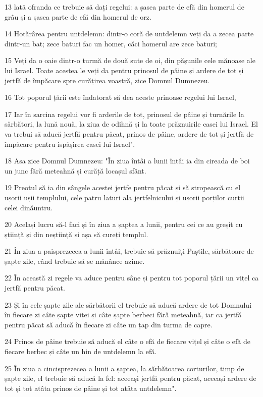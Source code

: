\par 13 lată ofranda ce trebuie să dați regelui: a șasea parte de efă din homerul de grâu și a șasea parte de efă din homerul de orz.
\par 14 Hotărârea pentru untdelemn: dintr-o coră de untdelemn veți da a zecea parte dintr-un bat; zece baturi fac un homer, căci homerul are zece baturi;
\par 15 Veți da o oaie dintr-o turmă de două sute de oi, din pășunile cele mănoase ale lui Israel. Toate acestea le veți da pentru prinosul de pâine și ardere de tot și jertfă de împăcare spre curățirea voastră, zice Domnul Dumnezeu.
\par 16 Tot poporul țării este îndatorat să dea aceste prinoase regelui lui Israel,
\par 17 Iar în sarcina regelui vor fi arderile de tot, prinosul de pâine și turnările la sărbători, la lună nouă, la ziua de odihnă și la toate prăznuirile casei lui Israel. El va trebui să aducă jertfă pentru păcat, prinos de pâine, ardere de tot și jertfă de împăcare pentru ispășirea casei lui Israel".
\par 18 Asa zice Domnul Dumnezeu: "În ziua întâi a lunii întâi ia din cireada de boi un junc fără meteahnă și curăță locașul sfânt.
\par 19 Preotul să ia din sângele acestei jertfe pentru păcat și să stropească cu el ușorii ușii templului, cele patru laturi ala jertfelnicului și ușorii porților curții celei dinăuntru.
\par 20 Același lucru să-l faci și în ziua a șaptea a lunii, pentru cei ce au greșit cu știință și din neștiință și așa să cureți templul.
\par 21 În ziua a paisprezecea a lunii întâi, trebuie să prăznuiți Paștile, sărbătoare de șapte zile, când trebuie să se mănânce azime.
\par 22 În această zi regele va aduce pentru sâne și pentru tot poporul țării un vițel ca jertfă pentru păcat.
\par 23 Și în cele șapte zile ale sărbătorii el trebuie să aducă ardere de tot Domnului în fiecare zi câte șapte viței și câte șapte berbeci fără meteahnă, iar ca jertfă pentru păcat să aducă în fiecare zi câte un țap din turma de capre.
\par 24 Prinos de pâine trebuie să aducă el câte o efă de fiecare vițel și câte o efă de fiecare berbec și câte un hin de untdelemn la efă.
\par 25 În ziua a cincisprezecea a lunii a șaptea, la sărbătoarea corturilor, timp de șapte zile, el trebuie să aducă la fel: aceeași jertfă pentru păcat, aceeași ardere de tot și tot atâta prinos de pâine și tot atâta untdelemn".


